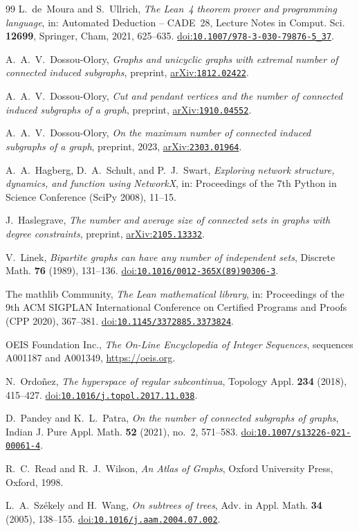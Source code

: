 \documentclass[11pt]{amsart}
\theoremstyle{definition}
\theoremstyle{remark}
\newcommand{\doi}[1]{\href{https://doi.org/#1}{doi:\nolinkurl{#1}}}
\newcommand{\arXiv}[1]{\href{https://arxiv.org/abs/#1}{arXiv:\nolinkurl{#1}}}
\begin{document}
\begin{thebibliography}{99}
L.~de~Moura and S.~Ullrich,
\emph{The Lean~4 theorem prover and programming language},
in: Automated Deduction -- CADE~28, Lecture Notes in Comput. Sci. \textbf{12699}, Springer, Cham, 2021, 625--635.
\doi{10.1007/978-3-030-79876-5_37}.

A.~A.~V.~Dossou-Olory,
\emph{Graphs and unicyclic graphs with extremal number of connected induced subgraphs},
preprint, \arXiv{1812.02422}.

A.~A.~V.~Dossou-Olory,
\emph{Cut and pendant vertices and the number of connected induced subgraphs of a graph},
preprint, \arXiv{1910.04552}.

A.~A.~V.~Dossou-Olory,
\emph{On the maximum number of connected induced subgraphs of a graph},
preprint, 2023, \arXiv{2303.01964}.

A.~A.~Hagberg, D.~A.~Schult, and P.~J.~Swart,
\emph{Exploring network structure, dynamics, and function using NetworkX},
in: Proceedings of the 7th Python in Science Conference (SciPy 2008), 11--15.

J.~Haslegrave,
\emph{The number and average size of connected sets in graphs with degree constraints},
preprint, \arXiv{2105.13332}.

V.~Linek,
\emph{Bipartite graphs can have any number of independent sets},
Discrete Math. \textbf{76} (1989), 131--136.
\doi{10.1016/0012-365X(89)90306-3}.

The mathlib Community,
\emph{The Lean mathematical library},
in: Proceedings of the 9th ACM SIGPLAN International Conference on Certified Programs and Proofs (CPP 2020), 367--381.
\doi{10.1145/3372885.3373824}.

OEIS Foundation Inc.,
\emph{The On-Line Encyclopedia of Integer Sequences},
sequences A001187 and A001349, \url{https://oeis.org}.

N.~Ordo\~nez,
\emph{The hyperspace of regular subcontinua},
Topology Appl. \textbf{234} (2018), 415--427.
\doi{10.1016/j.topol.2017.11.038}.

D.~Pandey and K.~L.~Patra,
\emph{On the number of connected subgraphs of graphs},
Indian J. Pure Appl. Math. \textbf{52} (2021), no.~2, 571--583.
\doi{10.1007/s13226-021-00061-4}.

R.~C.~Read and R.~J.~Wilson,
\emph{An Atlas of Graphs},
Oxford University Press, Oxford, 1998.

L.~A.~Sz\'ekely and H.~Wang,
\emph{On subtrees of trees},
Adv. in Appl. Math. \textbf{34} (2005), 138--155.
\doi{10.1016/j.aam.2004.07.002}.


\end{thebibliography}
\end{document}
